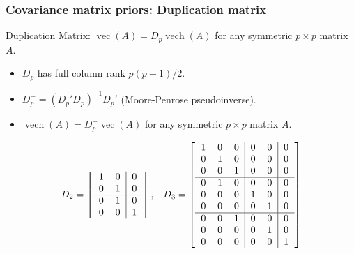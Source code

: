 \documentclass[xcolor=dvipsnames]{beamer}
\DeclareMathOperator{\vech}{vech}
\DeclareMathOperator{\vect}{vec}
\begin{document}
\begin{frame}
\frametitle{Covariance matrix priors: Duplication matrix}
Duplication Matrix: $\vect(A)=D_p\vech(A)$ for any symmetric $p\times p$ matrix $A$.
\begin{itemize}
\item $D_p$ has full column rank $p(p+1)/2$.
\item $D_p^{+}=(D_p'D_p)^{-1}D_p'$ (Moore-Penrose pseudoinverse).
\item $\vech(A)=D_p^+\vect(A)$ for any symmetric $p\times p$ matrix $A$.
\end{itemize}
\pause\begin{align*}
D_2 = \left[\begin{tabular}{cc|c} 1 & 0 & 0 \\ 0 & 1 &  0 \\\hline 0 & 1 & 0\\ 0 & 0 & 1 \end{tabular}\right], && D_3 =  \left[\begin{tabular}{ccc|cc|c}
1 & 0 & 0 & 0 & 0 & 0 \\ 
0 & 1 & 0 & 0 & 0 & 0 \\ 
0 & 0 & 1 & 0 & 0 & 0 \\\hline
0 & 1 & 0 & 0 & 0 & 0 \\
0 & 0 & 0 & 1 & 0 & 0 \\
0 & 0 & 0 & 0 & 1 & 0 \\\hline
0 & 0 & 1 & 0 & 0 & 0 \\
0 & 0 & 0 & 0 & 1 & 0 \\
0 & 0 & 0 & 0 & 0 & 1
\end{tabular}\right]\\~\\
\end{align*}
\end{frame}
\end{document}
